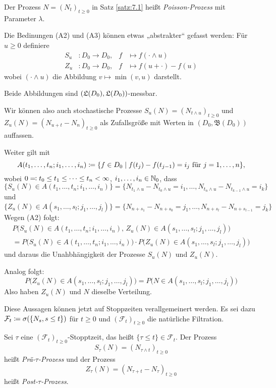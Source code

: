 \documentclass[a4paper,twoside,DIV15,BCOR12mm]{scrbook}
\newcommand{\cF}{\mathcal F}
\newcommand{\borel}{{\mathfrak B}}
\begin{document}
\begin{bemerkung}
Der Prozess $N=(N_t)_{t\ge 0}$ in Satz \ref{satz:7.1} heißt \emph{Poisson-Prozess} mit Parameter $\lambda$.
\end{bemerkung}

Die Bedinungen (A2) und (A3) können etwas „abstrakter“ gefasst werden: Für $u\ge 0$ definiere
\begin{align*}
S_u &: D_0 \to D_0,  & f &\mapsto f(\cdot\wedge u)\\
Z_u &: D_0 \to D_0,  & f &\mapsto f(u+\cdot)-f(u)
\end{align*}
wobei $(\cdot \wedge u)$ die Abbildung $v\mapsto \min (v,u)$ darstellt.

Beide Abbildungen sind $(\frak L(D_0), \frak L(D_0))$-messbar.

Wir können also auch stochastische Prozesse $S_u(N) = (N_{t\wedge u})_{t\ge 0}$ und $Z_u(N) = (N_{u+t} - N_n)_{t\ge 0}$ als Zufallsgröße mit Werten in $(D_0,\borel(D_0))$ auffassen.

Weiter gilt mit 
\[
A(t_1,\ldots,t_n;i_1,\ldots,i_n) \da \{f\in D_0\mid f(t_j) - f(t_{j-1}) = i_j\text{ für }j=1,\ldots,n\},
\]
wobei $0 \ad t_0\le t_1\le \cdots\le t_n < \infty$, $i_1,\ldots,i_n\in\mathbb{N}_0$, dass
\[
\{S_u(N) \in A(t_1,\ldots,t_n;i_1,\ldots,i_n)\} 
= \{ N_{t_1\wedge u}- N_{t_0\wedge u} = i_1,\ldots,N_{t_n\wedge u}- N_{t_{k-1}\wedge u} = i_k\}
\]
und
\[
\{Z_u(N) \in A(s_1,\ldots,s_l;j_1,\ldots,j_l)\} 
= \{ N_{n+s_1}- N_{n+s_0} = j_1,\ldots,N_{n+s_l}- N_{n+s_{l-1}} = j_k\} 
\]
Wegen (A2) folgt:
\begin{multline*}
P\big(S_u(N) \in A(t_1,\ldots,t_n;i_1,\ldots,i_n),\,
 Z_u(N) \in A(s_1,\ldots,s_l;j_1,\ldots,j_l)\big) \\
= P\big(S_u(N) \in A(t_1,\ldots,t_n;i_1,\ldots,i_n)\big) 
\cdot P\big(Z_u(N) \in A(s_1,\ldots,s_l;j_1,\ldots,j_l)\big) 
\end{multline*}
und daraus die Unahbhängigkeit der Prozesse $S_u(N)$ und $Z_u(N)$.

Analog folgt:
\[
P\big(Z_u(N) \in A(s_1,\ldots,s_l;j_1,\ldots,j_l)\big) 
= P\big( N \in A(s_1,\ldots,s_l;j_1,\ldots,j_l)\big)
\]
Also haben $Z_u(N)$ und $N$ dieselbe Verteilung.

Diese Aussagen können jetzt auf Stoppzeiten verallgemeinert werden. Es sei dazu $\cF_t \da \sigma(\{N_s, s\le t\})$ für $t\ge 0$ und $(\cF_t)_{t\ge 0}$ die natürliche Filtration.

\begin{definition}
Sei $\tau$ eine $(\cF_t)_{t\ge 0}$-Stopptzeit, das heißt $\{\tau \le t \} \in \cF_t$. Der Prozess 
\[
S_\tau(N) = (N_{\tau \wedge t})_{t\ge 0}
\]
heißt \emph{Prä-$\tau$-Prozess} und der Prozess 
\[
Z_\tau(N) = (N_{\tau + t} - N_\tau)_{t \ge 0}
\]
heißt \emph{Post-$\tau$-Prozess}.
\end{definition}
\end{document}
